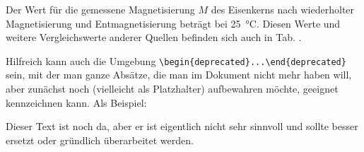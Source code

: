 Der Wert für die gemessene Magnetisierung $M$ des Eisenkerns nach wiederholter Magnetisierung und Entmagnetisierung beträgt  bei \SI{25}{\celsius}. Diesen Werte und weitere Vergleichswerte anderer Quellen befinden sich auch in Tab. .

Hilfreich kann auch die Umgebung \verb|\begin{deprecated}...\end{deprecated}| sein, mit der man ganze Absätze, die man im Dokument nicht mehr haben will, aber zunächst noch (vielleicht als Platzhalter) aufbewahren möchte, geeignet kennzeichnen kann. Als Beispiel:

\begin{deprecated}
Dieser Text ist noch da, aber er ist eigentlich nicht sehr sinnvoll und sollte besser ersetzt oder gründlich überarbeitet werden.
\end{deprecated}
